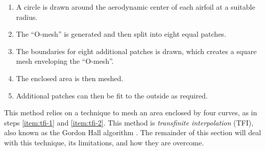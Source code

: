 \documentclass[3p,times,procedia]{elsarticle}
\begin{document}
\begin{enumerate}
\item A circle is drawn around the aerodynamic center of each airfoil at a suitable radius.
\item The ``O-mesh'' is generated and then split into eight equal patches. \label{item:tfi-1}
\item The boundaries for eight additional patches is drawn, which creates a square mesh enveloping
  the ``O-mesh''.
\item The enclosed area is then meshed. \label{item:tfi-2}
\item Additional patches can then be fit to the outside as required.
\end{enumerate}

This method relies on a technique to mesh an area enclosed by four curves, as in
steps \ref{item:tfi-1} and \ref{item:tfi-2}. This method is \emph{transfinite
interpolation} (TFI), also known as the Gordon Hall algorithm
\cite{Gordon1973ccc}. The remainder of this section will deal with this
technique, its limitations, and how they are overcome.
\end{document}
